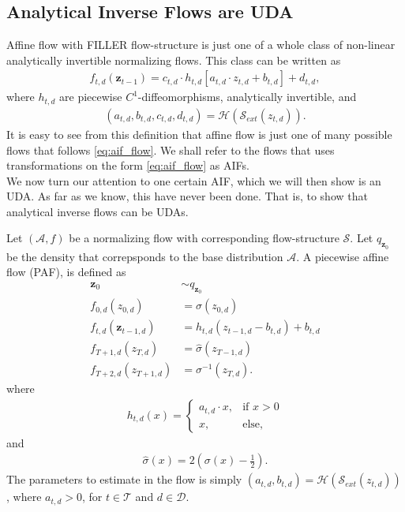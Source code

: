 \subsection{Analytical Inverse Flows are UDA}
Affine flow with FILLER flow-structure is just one of a whole class of non-linear analytically invertible normalizing flows. 
This class can be written as 
\begin{align}\label{eq:aif_flow}
    f_{t, d}(\bm z_{t-1}) = c_{t,d} \cdot h_{t,d}[a_{t,d} \cdot z_{t,d} 
    + b_{t,d}] + d_{t,d},
\end{align}
where \(h_{t,d}\) are piecewise \(C^1\)-diffeomorphisms, analytically invertible, and 
\begin{align*}
    (a_{t,d}, b_{t,d}, c_{t,d}, d_{t,d}) = \mathcal{H}(\mathcal{S}_{ext}(z_{t,d})).
\end{align*}
It is easy to see from this definition
that affine flow is just one of many possible flows that follows \cref{eq:aif_flow}. We shall refer to the flows
that uses transformations on the form \cref{eq:aif_flow} as AIFs.\\

We now turn our attention to one certain AIF, which we will then show is an UDA. As far as we know, this have never been done. That is,
to show that analytical inverse flows can be UDAs. 
\begin{definition}
    Let \((\mathcal{A}, f)\) be a normalizing flow with corresponding flow-structure \(\mathcal{S}\). Let \(q_{\bm z_0}\) be
    the density that correpsponds to the base distribution \(\mathcal{A}\). A piecewise affine flow (PAF), is defined as
    \begin{align}
        \bm z_0 &\sim q_{\bm z_0} \\
        f_{0,d}(z_{0,d}) &= \sigma(z_{0,d})\\
        f_{t,d}(\bm z_{t-1,d}) &= h_{t,d}(z_{t-1,d} - b_{t,d}) + b_{t,d} \label{eq:h_trans}\\
        f_{T+1,d}(z_{T,d}) &= \hat{\sigma}(z_{T-1,d})\\
        f_{T+2,d}(z_{T+1,d}) &= \sigma^{-1}(z_{T,d}).
    \end{align}
    where
    \begin{align}
        h_{t,d}(x) = 
        \begin{cases}
            a_{t,d}\cdot x, & \text{if \(x > 0\)} \\
            x,& \text{else},
        \end{cases}
    \end{align}
    and 
    \begin{align}
        \hat{\sigma}(x) = 2\left(\sigma(x) - \frac{1}{2}\right).
    \end{align}
    The parameters to estimate in the flow is simply \((a_{t,d}, b_{t,d}) = \mathcal{H}(\mathcal{S}_{ext}(z_{t,d}))\),
    where \(a_{t,d} > 0\), for \(t\in \mathcal{T}\) and \(d \in \mathcal{D}\).
\end{definition}

